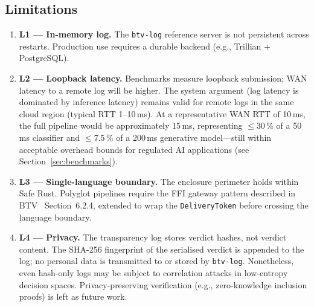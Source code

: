 \subsection{Limitations}

\begin{enumerate}
  \item \textbf{L1 --- In-memory log.} The \texttt{btv-log} reference server is
  not persistent across restarts. Production use requires a durable backend
  (e.g., Trillian + PostgreSQL).
  \item \textbf{L2 --- Loopback latency.} Benchmarks measure loopback
  submission; WAN latency to a remote log will be higher. The system argument
  (log latency is dominated by inference latency) remains valid for remote logs
  in the same cloud region (typical RTT 1--10\,ms). At a representative WAN RTT
  of 10\,ms, the full pipeline would be approximately 15\,ms, representing
  $\leq$30\,\% of a 50\,ms classifier and $\leq$7.5\,\% of a 200\,ms
  generative model---still within acceptable overhead bounds for regulated
  AI applications (see Section~\ref{sec:benchmarks}).
  \item \textbf{L3 --- Single-language boundary.} The enclosure perimeter holds
  within Safe Rust. Polyglot pipelines require the FFI gateway pattern described
  in BTV~\cite{btv2026} Section~6.2.4, extended to wrap the
  \texttt{DeliveryToken} before crossing the language boundary.
  \item \textbf{L4 --- Privacy.} The transparency log stores verdict hashes,
  not verdict content. The SHA-256 fingerprint of the serialised verdict is
  appended to the log; no personal data is transmitted to or stored by
  \texttt{btv-log}. Nonetheless, even hash-only logs may be subject to
  correlation attacks in low-entropy decision spaces. Privacy-preserving
  verification (e.g., zero-knowledge inclusion proofs) is left as future work.
\end{enumerate}
